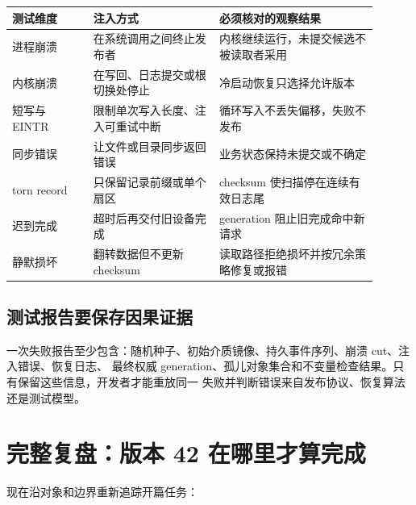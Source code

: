\begin{longtable}{|L{0.2\linewidth}|L{0.31\linewidth}|L{0.39\linewidth}|}
\hline
测试维度 & 注入方式 & 必须核对的观察结果 \\ \hline
进程崩溃 & 在系统调用之间终止发布者 & 内核继续运行，未提交候选不被读取者采用 \\\tablerowrule
内核崩溃 & 在写回、日志提交或根切换处停止 & 冷启动恢复只选择允许版本 \\\tablerowrule
短写与 EINTR & 限制单次写入长度、注入可重试中断 & 循环写入不丢失偏移，失败不发布 \\\tablerowrule
同步错误 & 让文件或目录同步返回错误 & 业务状态保持未提交或不确定 \\\tablerowrule
torn record & 只保留记录前缀或单个扇区 & checksum 使扫描停在连续有效日志尾 \\\tablerowrule
迟到完成 & 超时后再交付旧设备完成 & generation 阻止旧完成命中新请求 \\\tablerowrule
静默损坏 & 翻转数据但不更新 checksum & 读取路径拒绝损坏并按冗余策略修复或报错 \\
\hline
\end{longtable}

\subsection{测试报告要保存因果证据}

一次失败报告至少包含：随机种子、初始介质镜像、持久事件序列、崩溃 cut、注入错误、恢复日志、
最终权威 generation、孤儿对象集合和不变量检查结果。只有保留这些信息，开发者才能重放同一
失败并判断错误来自发布协议、恢复算法还是测试模型。

\section{完整复盘：版本 42 在哪里才算完成}

现在沿对象和边界重新追踪开篇任务：

